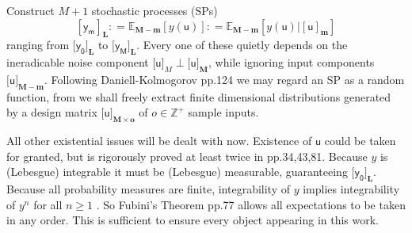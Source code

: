 \documentclass[preprint,12pt]{elsarticle}
\newcommand*{\M}[1]{\ensuremath{#1}\xspace}
\newcommand*{\x}{\times}
\newcommand*{\mi}[1]{\mathbf{#1}}
\newcommand*{\st}[1]{\mathbb{#1}}
\newcommand*{\rv}[1]{\mathsf{#1}}
\newcommand*{\te}[2][]{\left\lbrack{#2}\right\rbrack_{#1}}
\newcommand*{\tte}[2][]{\lbrack{#2}\rbrack_{#1}}
\newcommand*{\deq}{\M{\mathrel{\mathop:}=}}
\newcommand*{\ev}[3][]{\mathbb{E}_{#3}^{#1}\!\left\lbrack{#2}\right\rbrack}
\begin{document}
    Construct $M+1$ stochastic processes (SPs)
    \begin{equation}\label{def:Theory:y_m}
        \te[\mi{L}]{\rv{y_m}} \deq \ev{y(\rv{u})}{\mi{M-m}} \deq \ev{y(\rv{u}) \big\vert \te[\mi{m}]{\rv{u}}}{\mi{M-m}}
    \end{equation}
    ranging from $\tte[\mi{L}]{\rv{y_0}}$ to $\tte[\mi{L}]{\rv{y_M}}$. Every one of these quietly depends on the ineradicable noise component $\tte[M]{\rv{u}} \perp \tte[\mi{M}]{\rv{u}}$, while ignoring input components $\tte[\mi{M-m}]{\rv{u}}$. Following Daniell-Kolmogorov \cite{Rogers.Williams2000} pp.124 we may regard an SP as a random function, from we shall freely extract finite dimensional distributions generated by a design matrix $\tte[\mi{M\x o}]{\rv{u}}$ of $o \in \st{Z}^{+}$ sample inputs.

    All other existential issues will be dealt with now. Existence of $\rv{u}$ could be taken for granted, but is rigorously proved at least twice in \cite{Williams1991} pp.34,43,81. 
    Because $y$ is (Lebesgue) integrable it must be (Lebesgue) measurable, guaranteeing $\tte[\mi{L}]{\rv{y_0}}$.
    Because all probability measures are finite, integrability of $y$ implies integrability of $y^n$ for all $n\geq 1$ \cite{Villani1985}. 
    So Fubini's Theorem \cite{Williams1991} pp.77 allows all expectations to be taken in any order. 
    This is sufficient to ensure every object appearing in this work.
\end{document}
